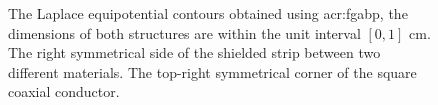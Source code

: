 \begin{figure}[t]
	\centering
	{
	\hspace{+4mm}
	}
	\caption[The Laplace equipotential contour lines.]{The Laplace equipotential contours obtained using \gls{acr:fgabp}, the dimensions of both structures are within the unit interval $\left[ 0,1 \right]$ cm. \protect{} The right symmetrical side of the shielded strip between two different materials. \protect{} The top-right symmetrical corner of the square coaxial conductor.}
	\label{fig:ps}
\end{figure}


